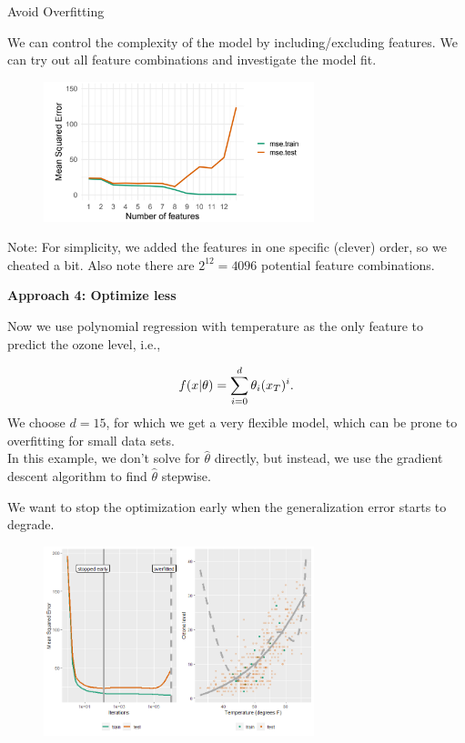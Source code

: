 \begin{vbframe}{Avoid Overfitting}
\framebreak 

We can control the complexity of the model by including/excluding features.
We can try out all feature combinations and investigate the model fit.


\begin{figure}
\includegraphics[width=0.7\textwidth]{figure_man/avoid-overfitting02.png}\\
\end{figure}

\vfill

\begin{footnotesize}
Note: For simplicity, we added the features in one specific (clever) order, so we cheated a bit. Also note there are $2^{12} = 4096$ potential feature combinations.
\end{footnotesize}

\framebreak

\textbf{Approach 4: Optimize less}

\lz 

Now we use polynomial regression with temperature as the only feature to predict the ozone level, i.e.,

$$f(x | \theta) = \sum^{d}_{i=0} \theta_i (x_T)^{i} .$$
We choose $d = 15$, for which we get a very flexible model, which can be prone to overfitting for small data sets. \\
\medskip
In this example, we don't solve for $\hat\theta$ directly, but instead, we use the gradient descent algorithm to find $\hat\theta$ stepwise.

\framebreak

We want to stop the optimization early when the generalization error starts to degrade.


\begin{figure}
\includegraphics[width=0.7\textwidth]{figure_man/mean-squ-error.png}\\
\end{figure}


\end{vbframe}
